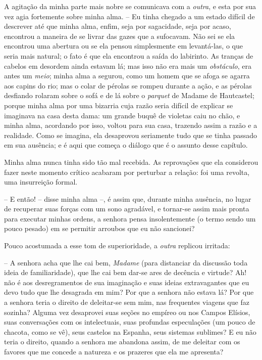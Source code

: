  A agitação da minha parte mais nobre se comunicava com a
\textit{outra}, e esta por sua vez agia fortemente sobre minha alma.
-- Eu tinha chegado a um estado difícil de descrever até que minha
alma, enfim, seja por sagacidade, seja por acaso, encontrou a maneira
de se livrar das gazes que a sufocavam. Não sei se ela encontrou uma
abertura ou se ela pensou simplesmente em levantá-las, o que seria mais
natural; o fato é que ela encontrou a saída do labirinto. As tranças de
cabelos em desordem ainda estavam lá; mas isso não era mais um
\textit{obstáculo}, era antes um \textit{meio}; minha alma a segurou,
como um homem que se afoga se agarra aos capins do rio; mas o colar de
pérolas se rompeu durante a ação, e as pérolas desfiando rolaram sobre
o sofá e de lá sobre o \textit{parquet} de Madame de Hautcastel; porque
minha alma por uma bizarria cuja razão seria difícil de explicar se
imaginava na casa desta dama: um grande buquê de violetas caiu no chão,
e minha alma, acordando por isso, voltou para sua casa, trazendo assim
a razão e a realidade. Como se imagina, ela desaprovou seriamente tudo
que se tinha passado em sua ausência; e é aqui que começa o diálogo que
é o assunto desse capítulo.

 Minha alma nunca tinha sido tão mal recebida. As reprovações que ela
considerou fazer neste momento crítico acabaram por perturbar a
relação: foi uma revolta, uma insurreição formal.

 -- E então! -- disse minha alma --, é assim que, durante minha
ausência, no lugar de recuperar suas forças com um sono agradável, e
tornar-se assim mais pronta para executar minhas ordens, a senhora
pensa insolentemente (o termo sendo um pouco pesado) em se permitir
arroubos que eu não sancionei?

 Pouco acostumada a esse tom de superioridade, a \textit{outra} replicou
irritada:

 -- A senhora acha que lhe cai bem, \textit{Madame} (para distanciar da
discussão toda ideia de familiaridade), que lhe cai bem dar-se ares de
decência e virtude? Ah! não é aos desregramentos de sua imaginação e
suas ideias extravagantes que eu devo tudo que lhe desagrada em mim?
Por que a senhora não estava lá? Por que a senhora teria o direito de
deleitar-se sem mim, nas frequentes viagens que faz sozinha? Alguma vez
desaprovei suas seções no empíreo ou nos Campos Elísios, suas
conversações com os intelectuais, suas profundas especulações (um pouco
de chacota, como se vê), seus castelos na Espanha, seus sistemas
sublimes? E eu não teria o direito, quando a senhora me abandona assim,
de me deleitar com os favores que me concede a natureza e os prazeres
que ela me apresenta?

